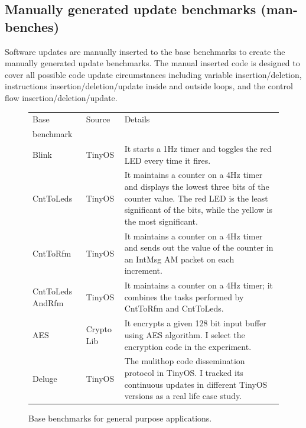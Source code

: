 \subsection{Manually generated update benchmarks (man-benches)}
Software updates are manually inserted to the base benchmarks to create the
manually generated update benchmarks.
The manual inserted code is designed to cover all possible code update circumstances
including variable insertion/deletion, 
instructions insertion/deletion/update inside and outside loops, and the control flow
insertion/deletion/update.
\begin{figure}[htbp]
\centering
\begin{small}
\begin{tabular}{||p{1in}|p{0.5in}|p{4in}||} 
\hline
Base  & Source & Details \\ 
benchmark & & \\\hline  \hline

Blink & TinyOS & It starts a 1Hz timer and toggles the red
LED every time it fires. \\ \hline

CntToLeds & TinyOS & It maintains a counter on a 4Hz timer and
displays the lowest three bits of the counter value. The red LED is
the least significant of the bits, while the yellow is the most
significant. \\ \hline

CntToRfm & TinyOS & It maintains a counter on a 4Hz timer and sends
out the value of the counter in an IntMsg AM packet on each
increment. \\ \hline

CntToLeds AndRfm & TinyOS & It maintains a counter on a 4Hz timer; it
combines the tasks performed by CntToRfm and CntToLeds. \\ \hline

AES & Crypto Lib & It encrypts a given 128 bit input buffer using AES
algorithm. I select the encryption code in the experiment.\\ \hline \hline

Deluge & TinyOS & The mulithop code dissemination protocol in TinyOS. I tracked its continuous updates in different TinyOS versions as a real life case study. \\ \hline
\end{tabular}
\end{small}
\caption{Base benchmarks for general purpose applications.}
\label{fbench}
\end{figure}


